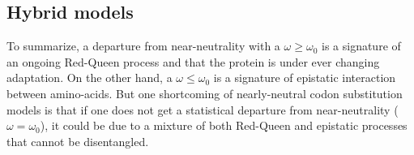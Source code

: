 \subsection{Hybrid models}

\citep{Nielsen2003}
To summarize, a departure from near-neutrality with a $\omega \geq \omega_0$ is a signature of an ongoing Red-Queen process and that the protein is under ever changing adaptation.
On the other hand, a $\omega \leq \omega_0$ is a signature of epistatic interaction between amino-acids.
But one shortcoming of \gls{nearly-neutral} \gls{codon} \gls{substitution} models is that if one does not get a statistical departure from near-neutrality ($\omega = \omega_0$), it could be due to a mixture of both Red-Queen and epistatic processes that cannot be disentangled.